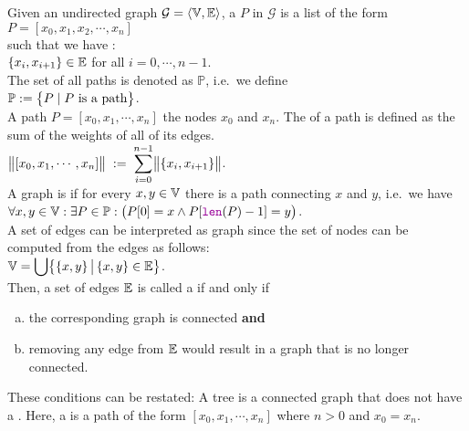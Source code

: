\noindent
Given an undirected graph $\mathcal{G} = \langle {\mathbb V}, {\mathbb E} \rangle$, a  $P$
in $\mathcal{G}$ is a list of the form 
\\[0.2cm]
\hspace*{1.3cm} 
$P = [ x_0, x_1, x_2, \cdots, x_n ]$ 
\\[0.2cm]
such that we have : \\[0.2cm]
\hspace*{1.3cm}
$\{x_i,x_{i+1}\} \in {\mathbb E}$  \quad for all $i = 0, \cdots, n-1$.
\\[0.2cm]
The set of all paths is denoted as $\mathbb{P}$, i.e.~we define
\\[0.2cm]
\hspace*{1.3cm}
$\displaystyle \mathbb{P}  := \bigl\{ P \mid \mbox{$P$ is a path} \bigr\}$.
\\[0.2cm]
A path $P = [ x_0, x_1, \cdots, x_n]$  the nodes $x_0$ and $x_n$.  The  of a
path is defined as
the sum of the weights of all of its edges.  
\\[0.2cm]
\hspace*{1.3cm}
 $\displaystyle\bigl\|[x_0,x_1, \cdots, x_n]\bigr\| \;:=\; \sum\limits_{i=0}^{n-1} \bigl\|\{x_i,x_{i+1}\}\bigr\|$. 
\\[0.2cm]
A graph is  if for every $x,y \in {\mathbb V}$ there is a path connecting $x$ and $y$, i.e.~we have
\\[0.2cm]
\hspace*{1.3cm}
$\forall x, y \in \mathbb{V}: \exists P \in \mathbb{P}: \bigl(P[0] = x \wedge P[\mytt{len}(P)-1] = y\bigr)$.
\\[0.2cm]
A set of edges can be interpreted as graph since the set of nodes can be computed from the edges as
follows: 
\\[0.2cm]
\hspace*{1.3cm}
$\displaystyle{\mathbb V} = \bigcup \bigl\{\{x,y\} \,\big|\, \{x,y\} \in {\mathbb E} \bigr\}$.
\\[0.2cm]
Then, a set of edges ${\mathbb E}$ is called a  if and only if
\begin{enumerate}[(a)]
\item the corresponding graph is connected \quad \textbf{and}
\item removing any edge from ${\mathbb E}$ would result in a graph that is no longer connected.
\end{enumerate}
These conditions can be restated: A tree is a connected graph that does not have a .
Here, a  is a path of the form $[x_0, x_1, \cdots, x_n]$ where $n > 0$ and $x_0 = x_n$.  

